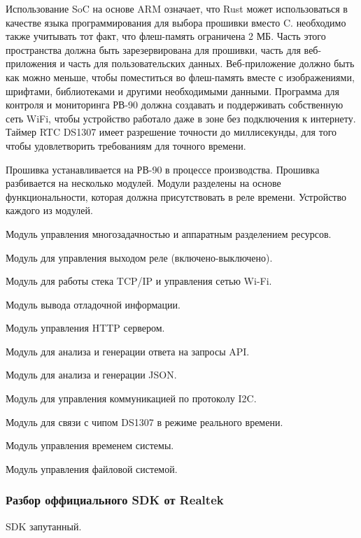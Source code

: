 Использование SoC на основе ARM означает, что Rust может использоваться в качестве языка программирования для выбора прошивки вместо C. необходимо также учитывать тот факт, что флеш-память ограничена 2 МБ. Часть этого пространства должна быть зарезервирована для прошивки, часть для веб-приложения и часть для пользовательских данных. Веб-приложение должно быть как можно меньше, чтобы поместиться во флеш-память вместе с изображениями, шрифтами, библиотеками и другими необходимыми данными. Программа для контроля и мониторинга РВ-90 должна создавать и поддерживать собственную сеть WiFi, чтобы устройство работало даже в зоне без подключения к интернету. Таймер RTC DS1307 имеет разрешение точности до миллисекунды, для того чтобы удовлетворить требованиям для точного времени.

Прошивка устанавливается на РВ-90 в процессе производства.  Прошивка разбивается на несколько модулей. Модули разделены на основе функциональности, которая должна присутствовать в реле времени. Устройство каждого из модулей.

\begin{my_itemize}
\item Модуль управления многозадачностью и аппаратным разделением ресурсов.
\item Модуль для управления выходом реле (включено-выключено).
\item Модуль для работы стека TCP/IP и управления сетью Wi-Fi.
\item Модуль вывода отладочной информации.
\item Модуль управления HTTP сервером.
\item Модуль для анализа и генерации ответа на запросы API.
\item Модуль для анализа и генерации JSON.
\item Модуль для управления коммуникацией по протоколу I2C.
\item Модуль для связи с чипом DS1307 в режиме реального времени.
\item Модуль управления временем системы.
\item Модуль управления файловой системой.
\end{my_itemize}



\subsubsection{ Разбор оффициального SDK от Realtek }
SDK запутанный.



